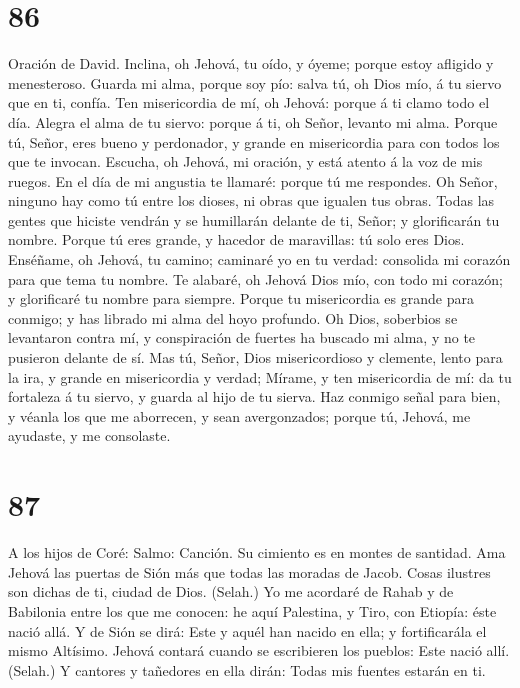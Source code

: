 \hypertarget{section-85}{%
\section{86}\label{section-85}}

 Oración de David. Inclina, oh Jehová, tu oído, y óyeme;
porque estoy afligido y menesteroso.  Guarda mi alma,
porque soy pío: salva tú, oh Dios mío, á tu siervo que en ti, confía.
 Ten misericordia de mí, oh Jehová: porque á ti clamo todo
el día.  Alegra el alma de tu siervo: porque á ti, oh
Señor, levanto mi alma.  Porque tú, Señor, eres bueno y
perdonador, y grande en misericordia para con todos los que te invocan.
 Escucha, oh Jehová, mi oración, y está atento á la voz de
mis ruegos.  En el día de mi angustia te llamaré: porque
tú me respondes.  Oh Señor, ninguno hay como tú entre los
dioses, ni obras que igualen tus obras.  Todas las gentes
que hiciste vendrán y se humillarán delante de ti, Señor; y glorificarán
tu nombre.  Porque tú eres grande, y hacedor de
maravillas: tú solo eres Dios.  Enséñame, oh Jehová, tu
camino; caminaré yo en tu verdad: consolida mi corazón para que tema tu
nombre.  Te alabaré, oh Jehová Dios mío, con todo mi
corazón; y glorificaré tu nombre para siempre.  Porque tu
misericordia es grande para conmigo; y has librado mi alma del hoyo
profundo.  Oh Dios, soberbios se levantaron contra mí, y
conspiración de fuertes ha buscado mi alma, y no te pusieron delante de
sí.  Mas tú, Señor, Dios misericordioso y clemente, lento
para la ira, y grande en misericordia y verdad;  Mírame,
y ten misericordia de mí: da tu fortaleza á tu siervo, y guarda al hijo
de tu sierva.  Haz conmigo señal para bien, y véanla los
que me aborrecen, y sean avergonzados; porque tú, Jehová, me ayudaste, y
me consolaste.

\hypertarget{section-86}{%
\section{87}\label{section-86}}

 A los hijos de Coré: Salmo: Canción. Su cimiento es en
montes de santidad.  Ama Jehová las puertas de Sión más
que todas las moradas de Jacob.  Cosas ilustres son dichas
de ti, ciudad de Dios. (Selah.)  Yo me acordaré de Rahab y
de Babilonia entre los que me conocen: he aquí Palestina, y Tiro, con
Etiopía: éste nació allá.  Y de Sión se dirá: Este y aquél
han nacido en ella; y fortificarála el mismo Altísimo. 
Jehová contará cuando se escribieren los pueblos: Este nació allí.
(Selah.)  Y cantores y tañedores en ella dirán: Todas mis
fuentes estarán en ti.

